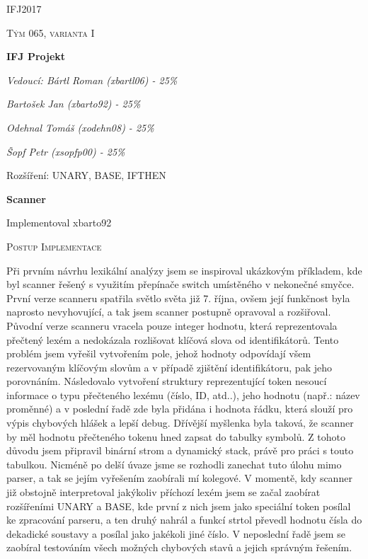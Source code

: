 \documentclass[12pt,a4paper]{report}
\begin{document}
\begin{titlepage}
	\centering
	{\scshape\LARGE IFJ2017 \par}
	\vspace{1cm}
	{\scshape\Large Tým 065, varianta I\par}
	\vspace{1.5cm}
	{\huge\bfseries IFJ Projekt\par}
	\vspace{2cm}
	{\Large\itshape Vedoucí: Bártl Roman (xbartl06) - 25\%\par}	
	{\Large\itshape Bartošek Jan (xbarto92) - 25\%\par}
	{\Large\itshape Odehnal Tomáš (xodehn08) - 25\%\par}
	{\Large\itshape Šopf Petr (xsopfp00) - 25\%\par}
	\vfill
	{\large Rozšíření: UNARY, BASE, IFTHEN}
\end{titlepage}


{\huge\bfseries Scanner \par}
Implementoval xbarto92 \par
\vspace{1cm}

{\scshape\Large Postup Implementace\par}
\vspace{0.3cm}
\noindent Při prvním návrhu lexikální analýzy jsem se inspiroval ukázkovým příkladem, kde byl scanner řešený s využitím přepínače switch umístěného v nekonečné smyčce. První verze scanneru spatřila světlo světa již 7. října, ovšem její funkčnost byla naprosto nevyhovující, a tak jsem scanner postupně opravoval a rozšiřoval. Původní verze scanneru vracela pouze integer hodnotu, která reprezentovala přečtený lexém a nedokázala rozlišovat klíčová slova od identifikátorů. Tento problém jsem vyřešil vytvořením pole, jehož hodnoty odpovídají všem rezervovaným klíčovým slovům a v případě zjištění identifikátoru, pak jeho porovnáním. Následovalo vytvoření struktury reprezentující token nesoucí informace o typu přečteného lexému (číslo, ID, atd..), jeho hodnotu (např.: název proměnné) a v poslední řadě zde byla přidána i hodnota řádku, která slouží pro výpis chybových hlášek a lepší debug. Dřívější myšlenka byla taková, že scanner by měl hodnotu přečteného tokenu hned zapsat do tabulky symbolů. Z tohoto důvodu jsem připravil binární strom a dynamický stack, právě pro práci s touto tabulkou. Nicméně po delší úvaze jsme se rozhodli zanechat tuto úlohu mimo parser, a tak se jejím vyřešením zaobírali mí kolegové. V momentě, kdy scanner již obstojně interpretoval jakýkoliv příchozí lexém jsem se začal zaobírat rozšířeními UNARY a BASE, kde první z nich jsem jako speciální token posílal ke zpracování parseru, a ten druhý nahrál a funkcí strtol převedl hodnotu čísla do dekadické soustavy a posílal jako jakékoli jiné číslo. V neposlední řadě jsem se zaobíral testováním všech možných chybových stavů a jejich správným řešením.
\vspace{1cm}
\end{document}

